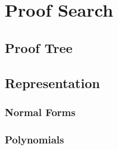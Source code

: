 \chapter{Proof Search}


\section{Proof Tree}

\section{Representation}

\subsection{Normal Forms}

\subsection{Polynomials}